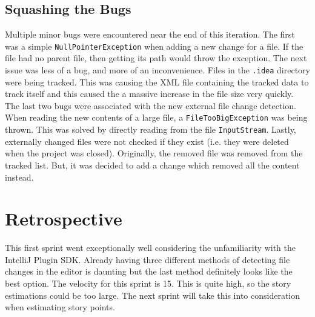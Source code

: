 \subsection{Squashing the Bugs}
Multiple minor bugs were encountered near the end of this iteration. The first was a simple \texttt{NullPointerException} when adding a new change for a file. If the file had no parent file, then getting its path would throw the exception. The next issue was less of a bug, and more of an inconvenience. Files in the \texttt{.idea} directory were being tracked. This was causing the XML file containing the tracked data to track itself and this caused the a massive increase in the file size very quickly. The last two bugs were associated with the new external file change detection. When reading the new contents of a large file, a \texttt{FileTooBigException} was being thrown. This was solved by directly reading from the file \texttt{InputStream}. Lastly, externally changed files were not checked if they exist (i.e. they were deleted when the project was closed). Originally, the removed file was removed from the tracked list. But, it was decided to add a change which removed all the content instead.

\section{Retrospective}
This first sprint went exceptionally well considering the unfamiliarity with the IntelliJ Plugin SDK. Already having three different methods of detecting file changes in the editor is daunting but the last method definitely looks like the best option. The velocity for this sprint is 15. This is quite high, so the story estimations could be too large. The next sprint will take this into consideration when estimating story points.
